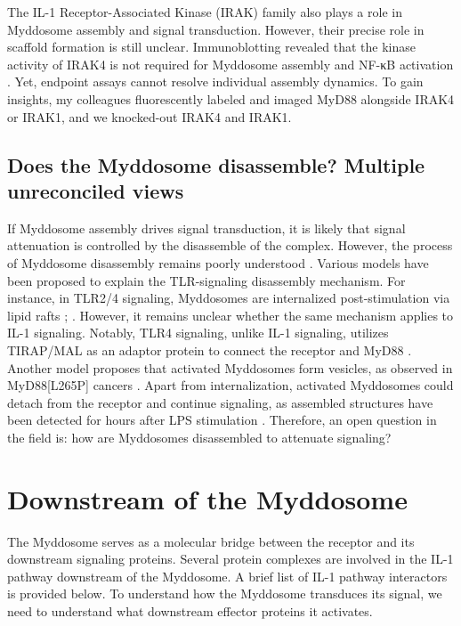 The IL-1 Receptor-Associated Kinase (IRAK) family also plays a role in Myddosome assembly and signal transduction. However, their precise role in scaffold formation is still unclear. Immunoblotting revealed that the kinase activity of IRAK4 is not required for Myddosome assembly and NF-κB activation \autocite{DeNardo_2018}. Yet, endpoint assays cannot resolve individual assembly dynamics. To gain insights, my colleagues fluorescently labeled and imaged MyD88 alongside IRAK4 or IRAK1, and we knocked-out IRAK4 and IRAK1.
 
\subsection{Does the Myddosome disassemble? Multiple unreconciled views}
\label{subsection:disassembly}
If Myddosome assembly drives signal transduction, it is likely that signal attenuation is controlled by the disassemble of the complex. However, the process of Myddosome disassembly remains poorly understood \autocite{Balka_2019}. Various models have been proposed to explain the TLR-signaling disassembly mechanism. For instance, in TLR2/4 signaling, Myddosomes are internalized post-stimulation via lipid rafts \autocite{Thieblemont_1998}\autocite{Thieblemont_1999}\autocite{Triantafilou_2004}\autocite{Triantafilou_2006}; \autocite{Kagan_2008}\autocite{Barbalat_2009}\autocite{Ruysschaert_2015}. However, it remains unclear whether the same mechanism applies to IL-1 signaling. Notably, TLR4 signaling, unlike IL-1 signaling, utilizes TIRAP/MAL as an adaptor protein to connect the receptor and MyD88 \autocite{Fitzgerald_2001}. Another model proposes that activated Myddosomes form vesicles, as observed in MyD88[L265P] cancers \autocite{Manček-Keber_2018}. Apart from internalization, activated Myddosomes could detach from the receptor and continue signaling, as assembled structures have been detected for hours after LPS stimulation \autocite{Balka_2019}\autocite{Nguyen_2017}. Therefore, an open question in the field is: how are Myddosomes disassembled to attenuate signaling?
 
\section{Downstream of the Myddosome}
\label{section:downstream}
The Myddosome serves as a molecular bridge between the receptor and its downstream signaling proteins. Several protein complexes are involved in the IL-1 pathway downstream of the Myddosome. A brief list of IL-1 pathway interactors is provided below. To understand how the Myddosome transduces its signal, we need to understand what downstream effector proteins it activates.
 
